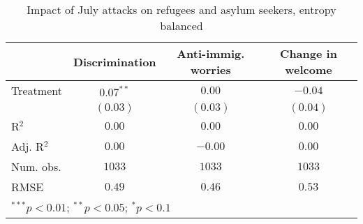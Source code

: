 
\begin{table}
\caption{Impact of July attacks on refugees and asylum seekers, entropy balanced}
\begin{center}
\begin{tabular}{l c c c}
\toprule
 & Discrimination & Anti-immig. worries & Change in welcome \\
\midrule
Treatment  & $0.07^{**}$ & $0.00$   & $-0.04$  \\
           & $(0.03)$    & $(0.03)$ & $(0.04)$ \\
\midrule
R$^2$      & $0.00$      & $0.00$   & $0.00$   \\
Adj. R$^2$ & $0.00$      & $-0.00$  & $0.00$   \\
Num. obs.  & $1033$      & $1033$   & $1033$   \\
RMSE       & $0.49$      & $0.46$   & $0.53$   \\
\bottomrule
\multicolumn{4}{l}{\scriptsize{$^{***}p<0.01$; $^{**}p<0.05$; $^{*}p<0.1$}}
\end{tabular}
\label{tab_host_match}
\end{center}
\end{table}
